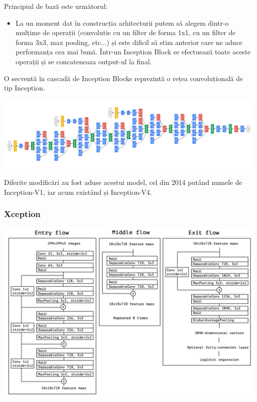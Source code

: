 Principiul de bază este următorul:

\begin{itemize}
\item La un moment dat în construcția arhitecturii putem să alegem dintr-o mulțime de operații (convolutie cu un filter de forma 1x1, cu un filter de forma 3x3, max pooling, etc...) și este dificil să stim anterior care ne aduce performanța cea mai bună. Într-un Inception Block se efectuează toate aceste operații și se concateneaza output-ul la final.
\end{itemize} 

O secventă în cascadă de Inception Blocks reprezintă o rețea convoluțională de tip Inception.

\begin{center}
\includegraphics[scale=0.7]{inception}
\end{center}

Diferite modificări au fost aduse acestui model, cel din 2014 putând numele de Inception-V1, iar acum existând și Inception-V4.

\subsubsection{Xception}

\begin{center}
\includegraphics[scale=0.3]{xception}
\end{center}

